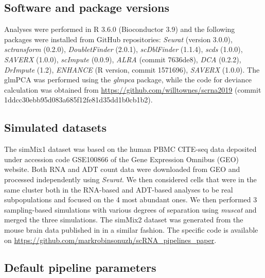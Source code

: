 \documentclass{bmcart}
\begin{document}
\subsection*{Software and package versions}
Analyses were performed in R 3.6.0 (Bioconductor 3.9) and the following packages were installed from GitHub repositories: \textit{Seurat} (version 3.0.0), \textit{sctransform} (0.2.0), \textit{DoubletFinder} (2.0.1), \textit{scDblFinder} (1.1.4), \textit{scds} (1.0.0), \textit{SAVERX} (1.0.0), \textit{scImpute} (0.0.9), \textit{ALRA} (commit 7636de8), \textit{DCA} (0.2.2), \textit{DrImpute} (1.2), \textit{ENHANCE} (R version, commit 1571696), \textit{SAVERX} (1.0.0). {\color{red}The glmPCA was performed using the \textit{glmpca} package, while the code for deviance calculation was obtained from \url{https://github.com/willtownes/scrna2019} (commit 1ddcc30ebb95d083a685f12fe81d35dd1b0cb1b2).}

\subsection*{Simulated datasets}
The simMix1 dataset was based on the human PBMC CITE-seq data deposited under accession code GSE100866 of the Gene Expression Omnibus (GEO) website. Both RNA and ADT count data were downloaded from GEO and processed independently using \textit{Seurat}. We then considered cells that were in the same cluster both in the RNA-based and ADT-based analyses to be real subpopulations and focused on the 4 most abundant ones. We then performed 3 sampling-based simulations with various degrees of separation using \textit{muscat} \cite{CrowellMuscat2019} and merged the three simulations. The simMix2 dataset was generated from the mouse brain data published in \cite{CrowellMuscat2019} in a similar fashion. The specific code is available on \url{https://github.com/markrobinsonuzh/scRNA\_pipelines\_paper}.

\subsection*{Default pipeline parameters}
\end{document}
